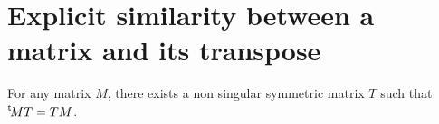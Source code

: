 \documentclass{article}%
\def\transpose#1{{\vphantom{#1}}^{\mathrm{t}}\!#1}
\begin{document}
{\color{blue}
\section{Explicit similarity between a matrix and its transpose}%
\label{A:T}
% 
\begin{prop}
\label{transpose-symmetric}
For any matrix $M$, 
there exists a non singular symmetric matrix $T$ such that $\transpose{M}T = TM$.
\end{prop}

}
\end{document}
